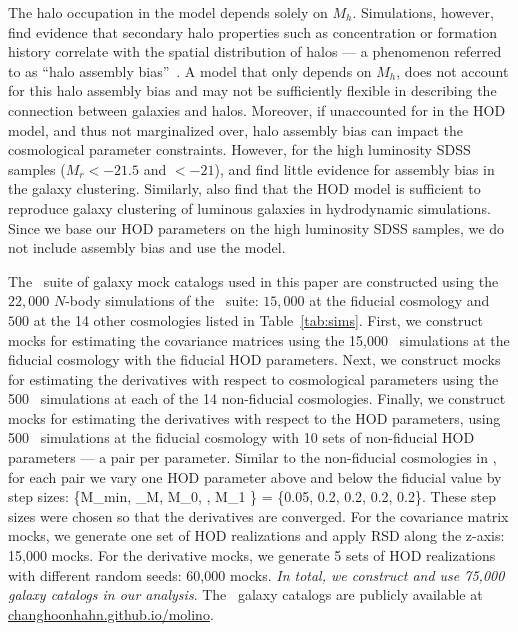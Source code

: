The halo occupation in the \cite{zheng2007} model depends solely on $M_h$. 
Simulations, however, find evidence that secondary halo properties such as
concentration or formation history correlate with the spatial distribution of
halos --- a phenomenon referred to as ``halo assembly bias''~\citep[\eg][]{sheth2004,
gao2005, harker2006, wechsler2006, dalal2008, wang2009, lacerna2014,
contreras2020, hadzhiyska2020}.
A model that only depends on $M_h$, does not account for this halo assembly 
bias and may not be sufficiently flexible in describing the connection between 
galaxies and halos. Moreover, if unaccounted for in the HOD model, and thus 
not marginalized over, halo assembly bias can impact the cosmological parameter constraints. 
However, for the high luminosity SDSS samples ($M_r < -21.5$  and $<-21$), 
\cite{zentner2016} and \cite{vakili2019} find little evidence for assembly bias 
in the galaxy clustering. Similarly, \cite{beltz-mohrmann2020} also find that
the \cite{zheng2007} HOD model is sufficient to reproduce galaxy clustering of
luminous galaxies in hydrodynamic simulations. Since we base our HOD parameters
on the high luminosity SDSS samples, we do not include assembly bias and use
the \cite{zheng2007} model. 


The \molino~suite of galaxy mock catalogs used in this paper are constructed using the
$22,000$ $N$-body simulations of the \quij~suite: $15,000$ at the fiducial
cosmology and $500$ at the 14 other cosmologies listed in Table~\ref{tab:sims}.
First, we construct mocks for estimating the
covariance matrices using the 15,000 \quij~simulations at the fiducial cosmology with
the fiducial HOD parameters. Next, we construct mocks for estimating the
derivatives with respect to cosmological parameters using the 500
\quij~simulations at each of the 14 non-fiducial cosmologies. Finally, we construct mocks for
estimating the derivatives with respect to the HOD parameters, using 500 
\quij~simulations at the fiducial cosmology with 10 sets of non-fiducial HOD
parameters --- a pair per parameter. Similar to the non-fiducial cosmologies in
\quij, for each pair we vary one HOD parameter above and below the fiducial
value by step sizes:
\beq
\{\Delta \log M_{\rm min}, \Delta \sigma_{\log M}, \Delta \log M_0, \Delta \alpha,
\Delta \log M_1 \} = \{0.05, 0.2, 0.2, 0.2, 0.2\}.
\eeq
These step sizes were chosen so that the derivatives are converged.
For the covariance matrix mocks, we generate one set of HOD realizations and apply 
RSD along the z-axis: 15,000 mocks. For the derivative mocks, we generate 5
sets of HOD realizations with different random seeds: 60,000 mocks. {\em In
total, we construct and use 75,000 galaxy catalogs in our analysis}.
The \molino~galaxy catalogs are publicly available at
\href{changhoonhahn.github.io/molino}{changhoonhahn.github.io/molino}.
